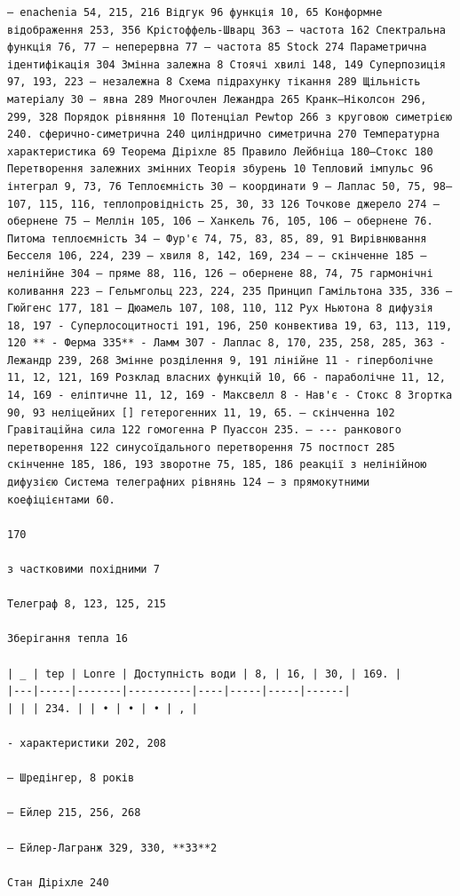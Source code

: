 \documentclass[
  ukrainian,
]{article}
\begin{document}
\begin{verbatim}
— enachenia 54, 215, 216 Відгук 96 функція 10, 65 Конформне відображення 253, 356 Крістоффель-Шварц 363 — частота 162 Спектральна функція 76, 77 — неперервна 77 — частота 85 Stock 274 Параметрична ідентифікація 304 Змінна залежна 8 Стоячі хвилі 148, 149 Суперпозиція 97, 193, 223 — незалежна 8 Схема підрахунку тікання 289 Щільність матеріалу 30 — явна 289 Многочлен Лежандра 265 Кранк–Ніколсон 296, 299, 328 Порядок рівняння 10 Потенціал Pewtop 266 з круговою симетрією 240. сферично-симетрична 240 циліндрично симетрична 270 Температурна характеристика 69 Теорема Діріхле 85 Правило Лейбніца 180–Стокс 180 Перетворення залежних змінних Теорія збурень 10 Тепловий імпульс 96 інтеграл 9, 73, 76 Теплоємність 30 — координати 9 — Лаплас 50, 75, 98—107, 115, 116, теплопровідність 25, 30, 33 126 Точкове джерело 274 — обернене 75 — Меллін 105, 106 — Ханкель 76, 105, 106 — обернене 76. Питома теплоємність 34 — Фур'є 74, 75, 83, 85, 89, 91 Вирівнювання Бесселя 106, 224, 239 — хвиля 8, 142, 169, 234 — — скінченне 185 — нелінійне 304 — пряме 88, 116, 126 — обернене 88, 74, 75 гармонічні коливання 223 — Гельмгольц 223, 224, 235 Принцип Гамільтона 335, 336 — Гюйгенс 177, 181 — Дюамель 107, 108, 110, 112 Рух Ньютона 8 дифузія 18, 197 - Суперлосоцитності 191, 196, 250 конвектива 19, 63, 113, 119, 120 ** - Ферма 335** - Ламм 307 - Лаплас 8, 170, 235, 258, 285, 363 - Лежандр 239, 268 Змінне розділення 9, 191 лінійне 11 - гіперболічне 11, 12, 121, 169 Розклад власних функцій 10, 66 - параболічне 11, 12, 14, 169 - еліптичне 11, 12, 169 - Максвелл 8 - Нав'є - Стокс 8 Згортка 90, 93 неліцейних [] гетерогенних 11, 19, 65. — скінченна 102 Гравітаційна сила 122 гомогенна P Пуассон 235. – --- ранкового перетворення 122 синусоїдального перетворення 75 постпост 285 скінченне 185, 186, 193 зворотне 75, 185, 186 реакції з нелінійною дифузією Система телеграфних рівнянь 124 — з прямокутними коефіцієнтами 60.

170

з частковими похідними 7

Телеграф 8, 123, 125, 215

Зберігання тепла 16

| _ | tep | Lonre | Доступність води | 8, | 16, | 30, | 169. |
|---|-----|-------|----------|----|-----|-----|------|
| | | 234. | | • | • | • | , |

- характеристики 202, 208

— Шредінгер, 8 років

— Ейлер 215, 256, 268

— Ейлер-Лагранж 329, 330, **33**2

Стан Діріхле 240
\end{verbatim}
\end{document}
